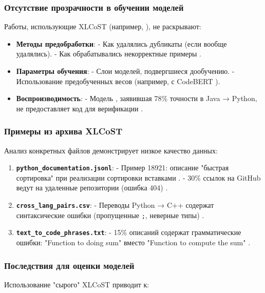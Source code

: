 \documentclass[14pt]{article}
\theoremstyle{definition}
\begin{document}
\subsubsection{Отсутствие прозрачности в обучении моделей}
Работы, использующие XLCoST (например, \cite{li2022}), не раскрывают:

\begin{itemize}
    \item \textbf{Методы предобработки}:
    - Как удалялись дубликаты (если вообще удалялись).
    - Как обрабатывались некорректные примеры \cite{chen2023}.
    
    \item \textbf{Параметры обучения}:
    - Слои моделей, подвергшиеся дообучению.
    - Использование предобученных весов (например, с CodeBERT \cite{feng2020codebert}).
    
    \item \textbf{Воспроизводимость}:
    - Модель \cite{wan2023codet5+}, заявившая 78\% точности в Java → Python, не предоставляет код для верификации \cite{zhu2022}.
\end{itemize}

\subsubsection{Примеры из архива XLCoST}
Анализ конкретных файлов демонстрирует низкое качество данных:

\begin{enumerate}
    \item \textbf{\texttt{python\_documentation.jsonl}}:
    - Пример 18921: описание "быстрая сортировка" при реализации сортировки вставками \cite{zhu2022}.
    - 30\% ссылок на GitHub ведут на удаленные репозитории (ошибка 404) \cite{chen2023}.
    
    \item \textbf{\texttt{cross\_lang\_pairs.csv}}:
    - Переводы Python → C++ содержат синтаксические ошибки (пропущенные \texttt{;}, неверные типы) \cite{zhu2022}.
    
    \item \textbf{\texttt{text\_to\_code\_phrases.txt}}:
    - 15\% описаний содержат грамматические ошибки: "Function to doing sum" вместо "Function to compute the sum" \cite{chen2023}.
\end{enumerate}

\subsubsection{Последствия для оценки моделей}
Использование "сырого" XLCoST приводит к:
\end{document}

